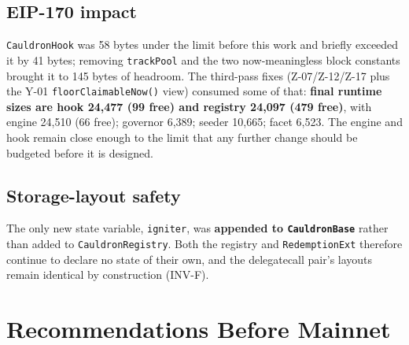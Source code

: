 \documentclass[10pt,a4paper]{article}
\newcommand{\code}[1]{\texttt{\small #1}}
\begin{document}
\subsection{EIP-170 impact}
\code{CauldronHook} was 58 bytes under the limit before this work and briefly exceeded it
by 41 bytes; removing \code{trackPool} and the two now-meaningless block constants brought
it to 145 bytes of headroom. The third-pass fixes (Z-07/Z-12/Z-17 plus the Y-01 \code{floorClaimableNow()} view)
consumed some of that:
\textbf{final runtime sizes are hook 24{,}477 (99 free) and registry 24{,}097 (479 free)},
with engine 24{,}510 (66 free); governor 6{,}389; seeder 10{,}665; facet 6{,}523.
The engine and hook remain close enough to the limit that any further change should be
budgeted before it is designed.

\subsection{Storage-layout safety}
The only new state variable, \code{igniter}, was \textbf{appended to
\code{CauldronBase}} rather than added to \code{CauldronRegistry}. Both the registry and
\code{RedemptionExt} therefore continue to declare no state of their own, and the
delegatecall pair's layouts remain identical by construction (INV-F).

\section{Recommendations Before Mainnet}
\end{document}

